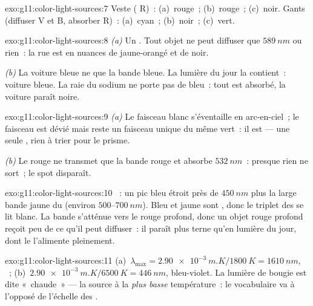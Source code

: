 \begin{solution}{exo:g11:color-light-sources:7}
Veste ( R)~: (a)~rouge~; (b)~rouge~;
(c)~noir. Gants (diffuser V et B, absorber R)~: (a)~cyan~; (b)~noir~;
(c)~vert.
\end{solution}

\begin{solution}{exo:g11:color-light-sources:8}
\emph{(a)} Un . Tout
objet ne peut diffuser que $\qty{589}{nm}$ ou rien~: la rue est en
nuances de jaune-orangé et de noir.

\emph{(b)} La voiture bleue ne
 que la bande bleue. La lumière du
jour la contient~: voiture bleue. La raie du sodium ne porte pas de
bleu~: tout est absorbé, la voiture paraît noire.
\end{solution}

\begin{solution}{exo:g11:color-light-sources:9}
\emph{(a)} Le faisceau blanc s'éventaille en arc-en-ciel~; le faisceau
 est dévié mais reste un faisceau unique
du même vert~: il est  --- une seule
, rien à trier pour le prisme.

\emph{(b)} Le  rouge ne transmet que
la bande rouge et absorbe $\qty{532}{nm}$~: presque rien ne sort~; le
spot disparaît.
\end{solution}

\begin{solution}{exo:g11:color-light-sources:10}
~: un pic bleu étroit près de
$\qty{450}{nm}$ plus la large bande jaune du
 (environ $500$--$\qty{700}{nm}$).
Bleu et jaune sont , donc le triplet des
 se lit blanc. La bande s'atténue vers le
rouge profond, donc un objet rouge profond reçoit peu de ce qu'il peut
diffuser~: il paraît plus terne qu'en lumière du jour, dont le
 l'alimente pleinement.
\end{solution}

\begin{solution}{exo:g11:color-light-sources:11}
(a)~$\lambda_{\max} = \qty{2.90e-3}{m.K}/\qty{1800}{K}
= \qty{1610}{nm}$, ~;
(b)~$\qty{2.90e-3}{m.K}/\qty{6500}{K} = \qty{446}{nm}$, bleu-violet.
La lumière de bougie est dite «~chaude~» --- la source à la
\emph{plus basse} température~: le vocabulaire va à l'opposé de
l'échelle des .
\end{solution}

